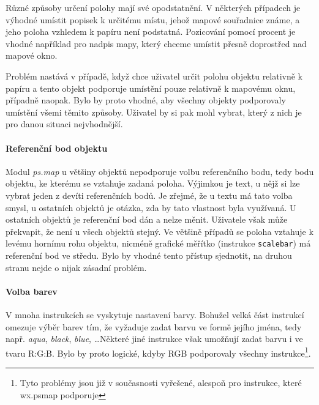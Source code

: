 \documentclass[a4paper,12pt,draft]{article}
\newcommand{\modul}[1]{\emph{#1}}
\newcommand{\instr}[1]{\lstinline[style=psmapInline]|#1|}
\begin{document}
Různé způsoby určení polohy mají své opodstatnění. V některých případech je výhodné umístit popisek k určitému místu, jehož mapové souřadnice známe, a jeho poloha vzhledem k papíru není podstatná. Pozicování pomocí procent je vhodné například pro nadpis mapy, který chceme umístit přesně doprostřed nad mapové okno. 

Problém nastává v případě, když chce uživatel určit polohu objektu relativně k papíru a tento objekt podporuje umístění pouze relativně k mapovému oknu, případně naopak. Bylo by proto vhodné, aby všechny objekty podporovaly umístění všemi těmito způsoby. Uživatel by si pak mohl vybrat, který z nich je pro danou situaci nejvhodnější.

\paragraph*{Referenční bod objektu}
\label{sec:psmap:referencepoint}
Modul \modul{ps.map} u většiny objektů nepodporuje volbu referenčního bodu, tedy bodu objektu, ke kterému se vztahuje zadaná poloha. Výjimkou je text, u nějž si lze vybrat jeden z devíti referenčních bodů. Je zřejmé, že u textu má tato volba smysl, u ostatních objektů je otázka, zda by tato vlastnost byla využívaná. 
U ostatních objektů je referenční bod dán a nelze měnit. Uživatele však může překvapit, že není u všech objektů stejný. Ve většině případů se poloha vztahuje k levému hornímu rohu objektu, nicméně grafické měřítko (instrukce \instr{scalebar}) má referenční bod ve středu. Bylo by vhodné tento přístup sjednotit, na druhou stranu nejde o nijak zásadní problém. 

\paragraph*{Volba barev}
\label{sec:psmap:color}
V mnoha instrukcích se vyskytuje nastavení barvy. Bohužel velká část instrukcí omezuje výběr barev tím, že vyžaduje zadat barvu ve formě jejího jména, tedy např. \emph{aqua}, \emph{black}, \emph{blue}, \ldots Některé jiné instrukce však umožňují zadat barvu i ve tvaru R:G:B. Bylo by proto logické, kdyby RGB podporovaly všechny instrukce\footnote{Tyto problémy jsou již v současnosti vyřešené, alespoň pro instrukce, které wx.psmap podporuje}. 
\end{document}

